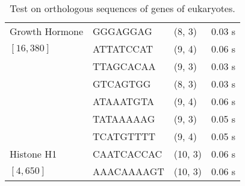 \begin{table}[h]
\begin{tabular}{|l|l|l|l|}
	 Growth Hormone 	& GGGAGGAG  & (8, 3) & 0.03 s \\ 
	 $[16, 380]$		& ATTATCCAT  & (9, 4) & 0.06 s \\ 
						& TTAGCACAA  & (9, 3) & 0.03 s \\ 
						& GTCAGTGG  & (8, 3) & 0.03 s \\ 
						& ATAAATGTA  & (9, 4) & 0.06 s \\ 
						& TATAAAAAG  & (9, 3) & 0.05 s \\ 
						& TCATGTTTT  & (9, 4) & 0.05 s \\ 

	 Histone H1 		& CAATCACCAC  & (10, 3) & 0.06 s \\ 
	 $[4, 650]$			& AAACAAAAGT  & (10, 3) & 0.06 s \\ 
 

	\hline\end{tabular}
	\caption{Test on orthologous sequences of genes of eukaryotes.}
	\label{tbl:orthologous}
\end{table}